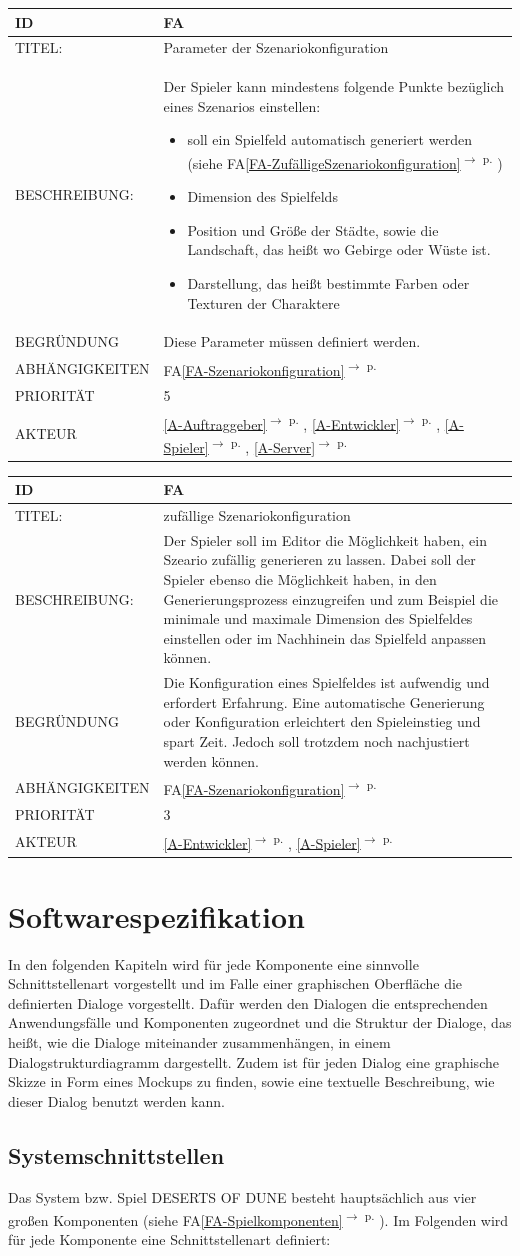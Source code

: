 \documentclass[12pt]{article}
\newcounter{fa}
\newcommand{\fa}[7]{
\refstepcounter{fa}\label{#7}
\begin{tabularx}{16cm}{l|X}
\textbf{ID} & \textbf{FA\arabic{fa}} \\
\hline
TITEL: & #1 \\
\hline
BESCHREIBUNG: & #2 \\
\hline
BEGRÜNDUNG & #3 \\ 
\hline
ABHÄNGIGKEITEN & #4\\ 
\hline 
PRIORITÄT & #5\\ 
\hline 
AKTEUR & #6
\end{tabularx}
}
\newcommand{\rref}[1]{\ref{#1}\textsuperscript{$\rightarrow$ p. \pageref{#1}}}
\newcommand{\faref}[1]{FA\ref{#1}\textsuperscript{$\rightarrow$ p. \pageref{#1}}}
\begin{document}
\fa{Parameter der Szenariokonfiguration}{Der Spieler kann mindestens folgende Punkte bezüglich eines Szenarios einstellen: 
\begin{itemize}
    \item soll ein Spielfeld automatisch generiert werden (siehe \faref{FA-ZufälligeSzenariokonfiguration})
    \item Dimension des Spielfelds
    \item Position und Größe der Städte, sowie die Landschaft, das heißt wo Gebirge oder Wüste ist. 
    \item Darstellung, das heißt bestimmte Farben oder Texturen der Charaktere
\end{itemize}}{Diese Parameter müssen definiert werden.}{\faref{FA-Szenariokonfiguration}}{5}{\rref{A-Auftraggeber}, \rref{A-Entwickler}, \rref{A-Spieler}, \rref{A-Server}}{FA-Parameter-Szenariokonfiguration}


\fa{zufällige Szenariokonfiguration}{Der Spieler soll im Editor die Möglichkeit haben, ein Szeario zufällig generieren zu lassen. Dabei soll der Spieler ebenso die Möglichkeit haben, in den Generierungsprozess einzugreifen und zum Beispiel die minimale und maximale Dimension des Spielfeldes einstellen oder im Nachhinein das Spielfeld anpassen können.
}{Die Konfiguration eines Spielfeldes ist aufwendig und erfordert Erfahrung. Eine automatische Generierung oder Konfiguration erleichtert den Spieleinstieg und spart Zeit. Jedoch soll trotzdem noch nachjustiert werden können.}{\faref{FA-Szenariokonfiguration}}{3}{\rref{A-Entwickler}, \rref{A-Spieler}}{FA-ZufälligeSzenariokonfiguration}

\section{Softwarespezifikation}
In den folgenden Kapiteln wird für jede Komponente eine sinnvolle Schnittstellenart vorgestellt und im Falle einer graphischen Oberfläche die definierten Dialoge vorgestellt. Dafür werden den Dialogen die entsprechenden Anwendungsfälle und Komponenten zugeordnet und die Struktur der Dialoge, das heißt, wie die Dialoge miteinander zusammenhängen, in einem Dialogstrukturdiagramm dargestellt. Zudem ist für jeden Dialog eine graphische Skizze in Form eines \glqq{}Mockups\grqq{} zu finden, sowie eine textuelle Beschreibung, wie dieser Dialog benutzt werden kann. 
\subsection{Systemschnittstellen}
Das System bzw. Spiel \textsc{DESERTS OF DUNE} besteht hauptsächlich aus vier großen Komponenten (siehe \faref{FA-Spielkomponenten}). Im Folgenden wird für jede Komponente eine Schnittstellenart definiert: 
\end{document}
